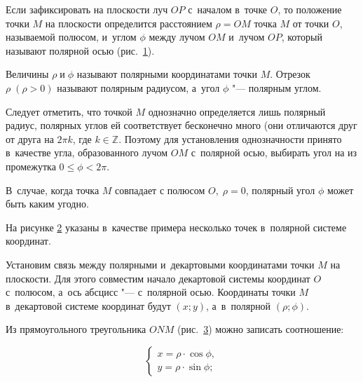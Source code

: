 Если зафиксировать на плоскости луч $OP$ с~началом в~точке $O$,
то положение точки $M$ на плоскости определится расстоянием $\rho = OM$
точка $M$ от точки $O$, называемой полюсом, и~углом $\phi$ между
лучом $OM$ и~лучом $OP$, который называют полярной осью (рис.\ \ref{fig_1_14_1}).

\begin{figure}\label{fig_1_14_1}
\end{figure}

Величины $\rho \; \text{и} \; \phi$ называют полярными координатами точки $M$.
Отрезок $\rho \; (\rho > 0)$ называют полярным радиусом,
а~угол $\phi$ "--- полярным углом.

Следует отметить, что точкой $M$ однозначно определяется лишь полярный радиус,
полярных углов ей соответствует бесконечно много (они отличаются друг от друга
на $2\pi k$, где $k \in \mathbb{Z}$.
Поэтому для установления однозначности принято в~качестве угла,
образованного лучом $OM$ с~полярной осью, выбирать угол на из промежутка
$0 \leqslant \phi < 2\pi$.

В~случае, когда точка $M$ совпадает с полюсом $O, \; \rho =  0$,
полярный угол $\phi$ может быть каким угодно.

На рисунке \ref{fig_1_14_2} указаны в~качестве примера несколько точек
в~полярной системе координат.

\begin{figure}\label{fig_1_14_2}
\end{figure}

Установим связь между полярными и~декартовыми координатами точки $M$
на плоскости. Для этого совместим начало декартовой системы координат $O$
с~полюсом, а~ось абсцисс "--- с~полярной осью.
Координаты точки $M$ в~декартовой системе координат будут $(x; y)$,
а~в~полярной $(\rho; \phi)$.

Из прямоугольного треугольника $O N M$ (рис.\ \ref{fig_1_14_3}) можно записать соотношение:

\begin{figure}\label{fig_1_14_3}
\end{figure}

\begin{equation}\label{eq_1_14_1}
\begin{cases}
x = \rho \cdot \cos \phi, \\
y = \rho \cdot \sin \phi;
\end{cases}
\end{equation}

